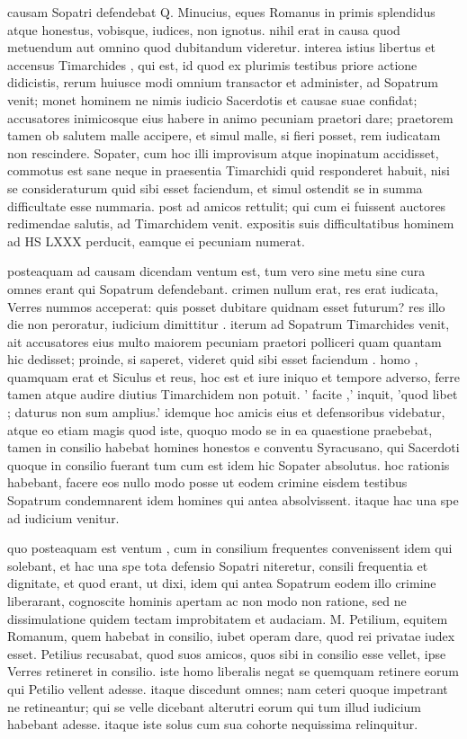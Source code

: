  causam Sopatri defendebat Q. Minucius, eques Romanus in primis splendidus atque honestus, vobisque, iudices, non ignotus. nihil erat in causa quod metuendum aut omnino quod dubitandum videretur. interea istius libertus et accensus Timarchides , qui est, id quod ex plurimis testibus priore actione didicistis, rerum huiusce modi omnium transactor et administer, ad Sopatrum venit; monet hominem ne nimis iudicio Sacerdotis et causae suae confidat; accusatores inimicosque eius habere in animo pecuniam praetori dare; praetorem tamen ob salutem malle accipere, et simul malle, si fieri posset, rem iudicatam non rescindere. Sopater, cum hoc illi improvisum atque inopinatum accidisset, commotus est sane neque in praesentia Timarchidi quid responderet habuit, nisi se consideraturum quid sibi esset faciendum, et simul ostendit se in summa difficultate esse nummaria. post ad amicos rettulit; qui cum ei fuissent auctores redimendae salutis, ad Timarchidem venit. expositis suis difficultatibus hominem ad HS LXXX perducit, eamque ei pecuniam numerat.

 posteaquam ad causam dicendam ventum est, tum vero sine metu sine cura omnes erant qui Sopatrum defendebant. crimen nullum erat, res erat iudicata, Verres nummos acceperat: quis posset dubitare quidnam esset futurum? res illo die non peroratur, iudicium dimittitur . iterum ad Sopatrum Timarchides venit, ait accusatores eius multo maiorem pecuniam praetori polliceri quam quantam hic dedisset; proinde, si saperet, videret quid sibi esset faciendum . homo , quamquam erat et Siculus et reus, hoc est et iure iniquo et tempore adverso, ferre tamen atque audire diutius Timarchidem non potuit. ' facite ,' inquit, 'quod libet ; daturus non sum amplius.' idemque hoc amicis eius et defensoribus videbatur, atque eo etiam magis quod iste, quoquo modo se in ea quaestione praebebat, tamen in consilio habebat homines honestos e conventu Syracusano, qui Sacerdoti quoque in consilio fuerant tum cum est idem hic Sopater absolutus. hoc rationis habebant, facere eos nullo modo posse ut eodem crimine eisdem testibus Sopatrum condemnarent idem homines qui antea absolvissent. itaque hac una spe ad iudicium venitur.

 quo posteaquam est ventum , cum in consilium frequentes convenissent idem qui solebant, et hac una spe tota defensio Sopatri niteretur, consili frequentia et dignitate, et quod erant, ut dixi, idem qui antea Sopatrum eodem illo crimine liberarant, cognoscite hominis apertam ac non modo non ratione, sed ne dissimulatione quidem tectam improbitatem et audaciam. M. Petilium, equitem Romanum, quem habebat in consilio, iubet operam dare, quod rei privatae iudex esset. Petilius recusabat, quod suos amicos, quos sibi in consilio esse vellet, ipse Verres retineret in consilio. iste homo liberalis negat se quemquam retinere eorum qui Petilio vellent adesse. itaque discedunt omnes; nam ceteri quoque impetrant ne retineantur; qui se velle dicebant alterutri eorum qui tum illud iudicium habebant adesse. itaque iste solus cum sua cohorte nequissima relinquitur.

